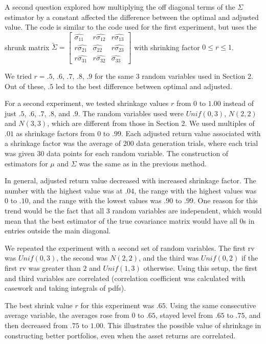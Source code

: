 \documentclass{article}
\begin{document}
A second question explored how multiplying the off diagonal terms of the $\Sigma$ estimator by a constant affected the difference between the optimal and adjusted value. The code is similar to the code used for the first experiment, but uses the shrunk matrix
$ \tilde{\Sigma} = \begin{bmatrix} \hat{\sigma_{11}} & r \hat{\sigma_{12}} & r \hat{\sigma_{13}}  \\ r \hat{\sigma_{21}}  & \hat{\sigma_{22}} & r \hat{\sigma_{23}} \\ r \hat{\sigma_{31}} & r \hat{\sigma_{32}} &  \hat{\sigma_{33}} \end{bmatrix} $ with shrinking factor $0 \leq r \leq 1$.


We tried  $r = .5$, $.6$, $.7$, $.8$, $.9$ for the same 3 random variables used in Section 2. Out of these, $.5$ led to the best difference between optimal and adjusted.

For a second experiment, we tested shrinkage values $r$ from $0$ to $1.00$ instead of just $.5$, $.6$, $.7$, $.8$, and $.9$. The random variables used were $Unif(0,3)$, $N(2,2)$ and $N(3,3)$, which are different from those in Section 2. We used multiples of $.01$ as shrinkage factors from $0$ to $.99$. Each adjusted return value associated with a shrinkage factor was the average of 200 data generation trials, where each trial was given 30 data points for each random variable. The construction of estimators for $\mu$ and $\Sigma$ was the same as in the previous method.

In general, adjusted return value decreased with increased shrinkage factor. The number with the highest value was at $.04$, the range with the highest values was $0$ to $.10$, and the range with the lowest values was $.90$ to $.99$. One reason for this trend would be the fact that all $3$ random variables are independent, which would mean that the best estimator of  the true covariance matrix would have all $0$s in entries outside the main diagonal.

We repeated the experiment with a second set of random variables. The first rv was $Unif(0,3)$, the second was $N(2,2)$, and the third was $Unif(0,2)$ if the first rv was greater than $2$ and $Unif(1,3)$ otherwise. Using this setup, the first and third variables are correlated (correlation coefficient was calculated with casework and taking integrals of pdfs).

The best shrink value $r$ for this experiment was $.65$. Using the same consecutive average variable, the averages rose from $0$ to $.65$, stayed level from $.65$ to $.75$, and then decreased from $.75$ to $1.00$. This illustrates the possible value of shrinkage in constructing better portfolios,
even when the asset returns are correlated.
\end{document}
